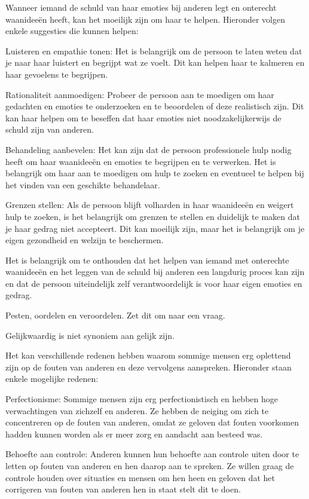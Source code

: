 Wanneer iemand de schuld van haar emoties bij anderen legt en onterecht waanideeën heeft, kan het moeilijk zijn om haar te helpen. Hieronder volgen enkele suggesties die kunnen helpen:

Luisteren en empathie tonen: Het is belangrijk om de persoon te laten weten dat je naar haar luistert en begrijpt wat ze voelt. Dit kan helpen haar te kalmeren en haar gevoelens te begrijpen.

Rationaliteit aanmoedigen: Probeer de persoon aan te moedigen om haar gedachten en emoties te onderzoeken en te beoordelen of deze realistisch zijn. Dit kan haar helpen om te beseffen dat haar emoties niet noodzakelijkerwijs de schuld zijn van anderen.

Behandeling aanbevelen: Het kan zijn dat de persoon professionele hulp nodig heeft om haar waanideeën en emoties te begrijpen en te verwerken. Het is belangrijk om haar aan te moedigen om hulp te zoeken en eventueel te helpen bij het vinden van een geschikte behandelaar.

Grenzen stellen: Als de persoon blijft volharden in haar waanideeën en weigert hulp te zoeken, is het belangrijk om grenzen te stellen en duidelijk te maken dat je haar gedrag niet accepteert. Dit kan moeilijk zijn, maar het is belangrijk om je eigen gezondheid en welzijn te beschermen.

Het is belangrijk om te onthouden dat het helpen van iemand met onterechte waanideeën en het leggen van de schuld bij anderen een langdurig proces kan zijn en dat de persoon uiteindelijk zelf verantwoordelijk is voor haar eigen emoties en gedrag.

Pesten, oordelen en veroordelen. Zet dit om naar een vraag.

Gelijkwaardig is niet synoniem aan gelijk zijn.

Het kan verschillende redenen hebben waarom sommige mensen erg oplettend zijn op de fouten van anderen en deze vervolgens aanspreken. Hieronder staan enkele mogelijke redenen:

Perfectionisme: Sommige mensen zijn erg perfectionistisch en hebben hoge verwachtingen van zichzelf en anderen. Ze hebben de neiging om zich te concentreren op de fouten van anderen, omdat ze geloven dat fouten voorkomen hadden kunnen worden als er meer zorg en aandacht aan besteed was.

Behoefte aan controle: Anderen kunnen hun behoefte aan controle uiten door te letten op fouten van anderen en hen daarop aan te spreken. Ze willen graag de controle houden over situaties en mensen om hen heen en geloven dat het corrigeren van fouten van anderen hen in staat stelt dit te doen.

